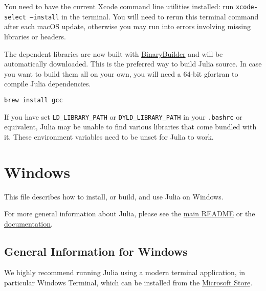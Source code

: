 You need to have the current Xcode command line utilities installed: run \texttt{xcode-select --install} in the terminal. You will need to rerun this terminal command after each macOS update, otherwise you may run into errors involving missing libraries or headers.



The dependent libraries are now built with \href{https://binarybuilder.org}{BinaryBuilder} and will be automatically downloaded. This is the preferred way to build Julia source. In case you want to build them all on your own, you will need a 64-bit gfortran to compile Julia dependencies.




\begin{lstlisting}
brew install gcc
\end{lstlisting}



If you have set \texttt{LD\_LIBRARY\_PATH} or \texttt{DYLD\_LIBRARY\_PATH} in your \texttt{.bashrc} or equivalent, Julia may be unable to find various libraries that come bundled with it. These environment variables need to be unset for Julia to work.



\hypertarget{16271249808016261018}{}


\section{Windows}



This file describes how to install, or build, and use Julia on Windows.



For more general information about Julia, please see the \href{https://github.com/JuliaLang/julia/blob/master/README.md}{main README} or the \href{https://docs.julialang.org}{documentation}.



\hypertarget{9379381249768363825}{}


\subsection{General Information for Windows}



We highly recommend running Julia using a modern terminal application, in particular Windows Terminal, which can be installed from the \href{https://aka.ms/terminal}{Microsoft Store}.



